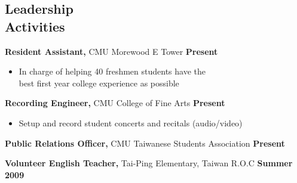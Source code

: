 \documentclass[sectioned]{dsyangres}
\begin{document}
\begin{resume}
\section{Leadership \\ Activities}

\textbf{Resident Assistant,} CMU Morewood E Tower \hfill \textbf{Present}
  \begin{itemize} \itemsep -2pt
    \item In charge of helping 40 freshmen students have the\\ best
      first year college experience as possible
  \end{itemize}

\textbf{Recording Engineer,} CMU College of Fine Arts \hfill \textbf{Present}
  \begin{itemize} \itemsep -2pt
    \item Setup and record student concerts and recitals (audio/video)
  \end{itemize}

\textbf{Public Relations Officer,} CMU Taiwanese Students
  Association \hfill \textbf{ Present}

\textbf{Volunteer English Teacher,} Tai-Ping Elementary, Taiwan R.O.C \hfill \textbf{ Summer 2009}

\end{resume} 
\end{document}
